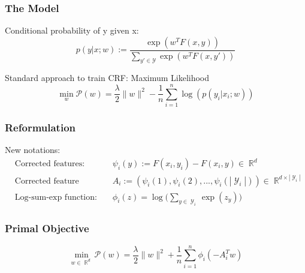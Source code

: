 \documentclass{beamer}
\DeclareMathOperator{\R}{\mathbb{R}}
\DeclareMathOperator{\1}{\mathbb{1}}
\DeclareMathOperator{\Y}{\mathcal{Y}}
\begin{document}
\begin{frame}
\frametitle{The Model}

Conditional probability of y given x:
\begin{equation*}
	\label{primal probability}
	p(y | x ; w) := \frac{\exp(w^TF(x, y))}{\sum_{y' \in \mathcal{Y}} \exp(w^TF(x, y'))}
\end{equation*}

Standard approach to train CRF: Maximum Likelihood
\begin{equation*}
	\min_w \mathscr P(w)  = \frac{\lambda}{2}\|w\|^2 - \frac{1}{n}   \sum_{i=1}^{n} \log(p(y_i|x_i; w))
\end{equation*}

\end{frame}
\begin{frame}
\frametitle{Reformulation}

New notations:
\begin{align*}
	&\textrm{Corrected features:} & \psi_i(y) := F(x_i, y_i) - F(x_i, y) \in \R^d \\
	&\textrm{Corrected feature matrix:} & A_i := ( \psi_i(1),\psi_i(2),...,\psi_i(|\Y_i|) ) \in \R^{d\times |\Y_i|} \\
	&\textrm{Log-sum-exp function:} & \phi_i(z) = \log \big(\sum_{y\in \Y_i} \exp(z_y)\big)
\end{align*}

\end{frame}
\begin{frame}
\frametitle{Primal Objective}

\begin{equation}
	\min_{w\in\R^d}  \mathscr P(w) = \frac{\lambda}{2}\|w\|^2 + \frac{1}{n}   \sum_{i=1}^{n} \phi_i(-A_i^Tw)
\end{equation}

\begin{center}
\end{center}


\end{frame}
\end{document}
